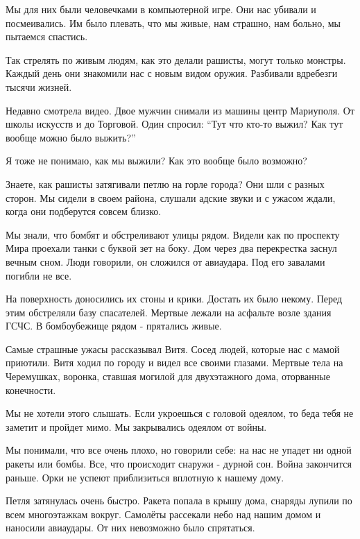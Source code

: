 Мы для них были человечками в компьютерной игре. Они нас убивали и
посмеивались.  Им было плевать, что мы живые, нам страшно, нам больно, мы
пытаемся спастись. 


Так стрелять по живым людям, как это делали рашисты, могут только монстры.
Каждый день они знакомили нас с  новым видом  оружия. Разбивали вдребезги
тысячи жизней. 

Недавно смотрела видео. Двое мужчин снимали из машины центр Мариуполя.  От
школы искусств и до Торговой. Один спросил: \enquote{Тут что кто-то выжил? Как
тут вообще можно было выжить?} 

Я тоже не понимаю, как мы  выжили? Как это вообще было возможно?


Знаете, как рашисты затягивали петлю  на горле города? Они шли с разных сторон.
Мы сидели в своем района, слушали адские  звуки  и с ужасом  ждали, когда   они
подберутся совсем близко. 


Мы знали, что  бомбят и обстреливают улицы рядом. Видели как по проспекту Мира
проехали танки с буквой зет на боку.  Дом через два перекрестка    заснул
вечным сном. Люди говорили, он сложился от авиаудара.   Под его  завалами
погибли не все. 

На поверхность доносились их стоны и крики. Достать их было некому. Перед этим
обстреляли базу спасателей.  Мертвые  лежали на асфальте возле здания ГСЧС. В
бомбоубежище рядом -  прятались  живые. 

Самые страшные ужасы рассказывал Витя. Сосед людей,  которые нас с мамой
приютили. Витя ходил  по городу и видел все своими глазами. Мертвые тела на
Черемушках, воронка, ставшая могилой для двухэтажного дома, оторванные
конечности.

Мы не хотели этого слышать. Если  укроешься с головой одеялом, то беда тебя не
заметит и пройдет мимо. Мы закрывались одеялом от войны. 

Мы понимали, что все очень плохо, но говорили себе: на нас не упадет ни одной
ракеты или бомбы. Все, что происходит снаружи - дурной сон. Война закончится
раньше. Орки не успеют приблизиться вплотную к нашему дому. 

Петля затянулась очень быстро.  Ракета попала в крышу дома, снаряды лупили по
всем   многоэтажкам  вокруг. Самолёты рассекали небо над нашим домом  и
наносили авиаудары. От них невозможно было спрятаться. 

